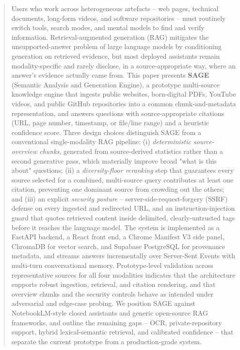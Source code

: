 \documentclass[conference]{IEEEtran}
\begin{document}
\begin{abstract}
Users who work across heterogeneous artefacts -- web pages, technical
documents, long-form videos, and software repositories -- must
routinely switch tools, search modes, and mental models to find and
verify information. Retrieval-augmented generation (RAG) mitigates the
unsupported-answer problem of large language models by conditioning
generation on retrieved evidence, but most deployed assistants remain
modality-specific and rarely disclose, in a source-appropriate way,
where an answer's evidence actually came from. This paper presents
\textbf{SAGE} (Semantic Analysis and Generation Engine), a prototype
multi-source knowledge engine that ingests public websites, born-digital
PDFs, YouTube videos, and public GitHub repositories into a common
chunk-and-metadata representation, and answers questions with
source-appropriate citations (URL, page number, timestamp, or file/line
range) and a heuristic confidence score. Three design choices
distinguish SAGE from a conventional single-modality RAG pipeline:
(i) \emph{deterministic source-overview chunks}, generated from
source-derived statistics rather than a second generative pass, which
materially improve broad "what is this about" questions; (ii) a
\emph{diversity-floor reranking} step that guarantees every source
selected for a combined, multi-source query contributes at least one
citation, preventing one dominant source from crowding out the others;
and (iii) an explicit \emph{security posture} -- server-side-request-forgery
(SSRF) defense on every ingested and redirected URL, and an
instruction-injection guard that quotes retrieved content inside
delimited, clearly-untrusted tags before it reaches the language model.
The system is implemented as a FastAPI backend, a React front end, a
Chrome Manifest V3 side panel, ChromaDB for vector search, and Supabase
PostgreSQL for provenance metadata, and streams answers incrementally
over Server-Sent Events with multi-turn conversational memory.
Prototype-level validation across representative sources for all four
modalities indicates that the architecture supports robust ingestion,
retrieval, and citation rendering, and that overview chunks and the
security controls behave as intended under adversarial and edge-case
probing. We position SAGE against NotebookLM-style closed assistants
and generic open-source RAG frameworks, and outline the remaining gaps
-- OCR, private-repository support, hybrid lexical-semantic retrieval,
and calibrated confidence -- that separate the current prototype from a
production-grade system.
\end{abstract}
\end{document}
